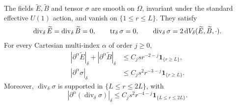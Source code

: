 \begin{lemma}
\label{lem:seeds}
The fields $\widetilde E,\widetilde B$ and tensor $\sigma$ are smooth on
$\Omega$, invariant under the standard effective $U(1)$ action, and vanish
on $\{1\le r\le L\}$.  They satisfy
\begin{equation}
\label{eq:seed-constraints}
 \operatorname{div}_\delta\widetilde E
 =\operatorname{div}_\delta\widetilde B=0,\qquad
 \operatorname{tr}_\delta\sigma=0,\qquad
 \operatorname{div}_\delta\sigma
 =2\mathop{}\!\mathrm d V_\delta(\widetilde E,\widetilde B,\cdot).
\end{equation}
For every Cartesian multi-index $\alpha$ of order $j\ge0$,
\begin{equation}
\label{eq:seed-bounds}
\begin{aligned}
 |\partial^\alpha\widetilde E|_\delta
 +|\partial^\alpha\widetilde B|_\delta
 &\le C_j s r^{-2-j}\mathbf1_{\{r\ge L\}},\\
 |\partial^\alpha\sigma|_\delta
 &\le C_j s^2 r^{-3-j}\mathbf1_{\{r\ge L\}}.
\end{aligned}
\end{equation}
Moreover, $\operatorname{div}_\delta\sigma$ is supported in
$\{L\le r\le2L\}$, with
\[
 |\partial^\alpha(\operatorname{div}_\delta\sigma)|_\delta
 \le C_j s^2r^{-4-j}\mathbf1_{\{L\le r\le2L\}}.
\]
\end{lemma}

